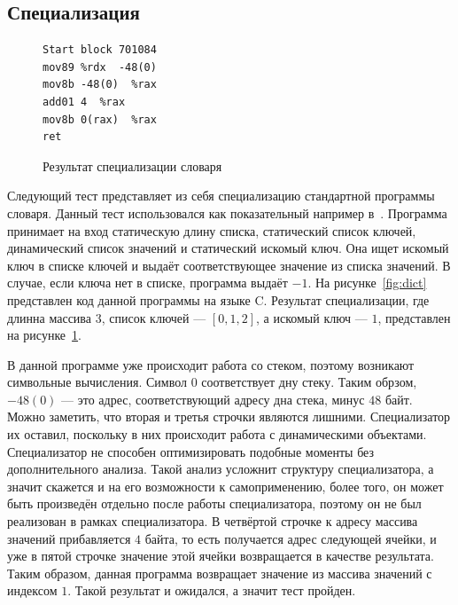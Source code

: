 \subsection{Специализация}

\begin{figure}
\begin{lstlisting}[xleftmargin = 20pt]
Start block 701084
mov89 %rdx  -48(0) 
mov8b -48(0)  %rax 
add01 4  %rax 
mov8b 0(rax)  %rax 
ret
\end{lstlisting}
\caption{Результат специализации словаря}
\label{fig:dictres}
\end{figure}
Следующий тест представляет из себя специализацию стандартной программы словаря.
Данный тест использовался как показательный например в~\cite{PEAPG}.
Программа принимает на вход статическую длину списка, статический список ключей, динамический список значений и статический искомый ключ.
Она ищет искомый ключ в списке ключей и выдаёт соответствующее значение из списка значений. В случае, если ключа нет в списке, программа выдаёт $-1$. На рисунке~\ref{fig:dict} представлен код данной программы на языке \textsf{C}.
Результат специализации, где длинна массива $3$, список ключей --- $[0, 1, 2]$, а искомый ключ --- $1$, представлен на рисунке~\ref{fig:dictres}.

В данной программе уже происходит работа со стеком, поэтому возникают символьные вычисления.
Символ $0$ соответствует дну стеку.
Таким обрзом, $-48(0)$ --- это адрес, соответствующий адресу дна стека, минус $48$ байт. Можно заметить, что вторая и третья строчки являются лишними. Специализатор их оставил, поскольку в них происходит работа с динамическими объектами.
Специализатор не способен оптимизировать подобные моменты без дополнительного анализа.
Такой анализ усложнит структуру специализатора, а значит скажется и на его возможности к самоприменению, более того,
он может быть произведён отдельно после работы специализатора, поэтому он не был реализован в рамках специализатора.
В четвёртой строчке к адресу массива значений прибавляется $4$ байта, то есть получается адрес следующей ячейки, и уже в пятой строчке значение этой ячейки возвращается в качестве результата. Таким образом, данная программа возвращает значение из массива значений с индексом $1$. Такой результат и ожидался, а значит тест пройден.



